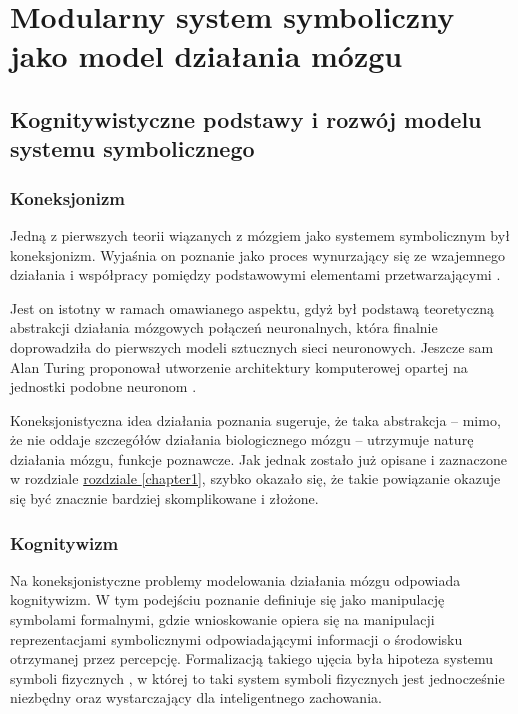 \chapter{Modularny system symboliczny jako model działania mózgu}


\section{Kognitywistyczne podstawy i rozwój modelu systemu symbolicznego}
\label{cognitive-basics}

\subsection{Koneksjonizm}

Jedną z pierwszych teorii wiązanych z mózgiem jako systemem symbolicznym był koneksjonizm.
Wyjaśnia on poznanie jako proces wynurzający się ze wzajemnego działania i współpracy pomiędzy podstawowymi elementami przetwarzającymi \cite{bechtel1993case}.

Jest on istotny w ramach omawianego aspektu, gdyż był podstawą teoretyczną abstrakcji działania mózgowych połączeń neuronalnych, która finalnie doprowadziła do pierwszych modeli sztucznych sieci neuronowych.
Jeszcze sam Alan Turing proponował utworzenie architektury komputerowej opartej na jednostki podobne neuronom \cite{copeland1996alan}.

Koneksjonistyczna idea działania poznania sugeruje, że taka abstrakcja -- mimo, że nie oddaje szczegółów działania biologicznego mózgu -- utrzymuje naturę działania mózgu, funkcje poznawcze.
Jak jednak zostało już opisane i zaznaczone w rozdziale \hyperref[chapter1]{rozdziale \ref{chapter1}}, szybko okazało się, że takie powiązanie okazuje się być znacznie bardziej skomplikowane i złożone.

\subsection{Kognitywizm}

Na koneksjonistyczne problemy modelowania działania mózgu odpowiada kognitywizm.
W tym podejściu poznanie definiuje się jako manipulację symbolami formalnymi, gdzie wnioskowanie opiera się na manipulacji reprezentacjami symbolicznymi odpowiadającymi informacji o środowisku otrzymanej przez percepcję.
Formalizacją takiego ujęcia była hipoteza systemu symboli fizycznych \cite{newell2007computer}, w której to taki system symboli fizycznych jest jednocześnie niezbędny oraz wystarczający dla inteligentnego zachowania.

